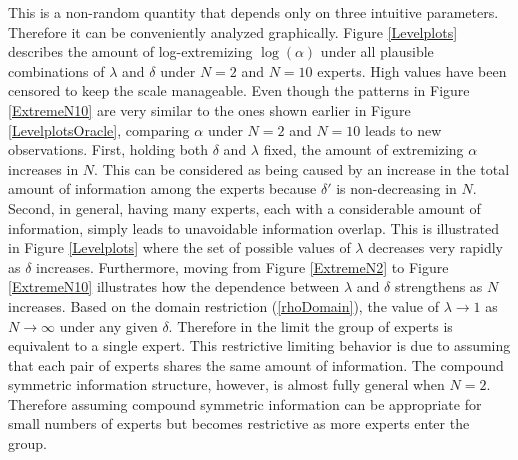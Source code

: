 \documentclass[11pt]{article}
\theoremstyle{definition}
\theoremstyle{definition}
\begin{document}
This is a non-random quantity that depends only on three intuitive parameters. Therefore it can be conveniently analyzed graphically. Figure \ref{Levelplots} describes the amount of log-extremizing $\log(\alpha)$ under all plausible combinations of $\lambda$ and $\delta$ under $N = 2$ and $N = 10$ experts. High values have been censored to keep the scale manageable. Even though the patterns in Figure \ref{ExtremeN10}  are very similar to the ones shown earlier in Figure \ref{LevelplotsOracle}, comparing $\alpha$ under $N = 2$ and $N = 10$ leads to new observations. First, holding both $\delta$ and $\lambda$ fixed, the amount of extremizing $\alpha$ increases in $N$. This can be considered as being caused by an increase in the total amount of information among the experts because $\delta'$ is non-decreasing in $N$. Second, in general, having many experts, each with a considerable amount of information, simply leads to unavoidable information overlap. This is illustrated in Figure \ref{Levelplots} where the set of possible values of $\lambda$ decreases very rapidly as $\delta$ increases. Furthermore, moving from Figure \ref{ExtremeN2} to Figure \ref{ExtremeN10} illustrates how the dependence between $\lambda$ and $\delta$ strengthens as $N$ increases. Based on the domain restriction (\ref{rhoDomain}), the value of $\lambda \to 1$ as $N \to \infty$ under any given $\delta$. Therefore in the limit the group of experts is equivalent to a single expert. This restrictive limiting behavior is due to assuming that each pair of experts shares the same amount of information. The compound symmetric information structure, however, is almost fully general when $N = 2$. Therefore assuming compound symmetric information can be appropriate for small numbers of experts but becomes restrictive as more experts enter the group. 
\end{document}
